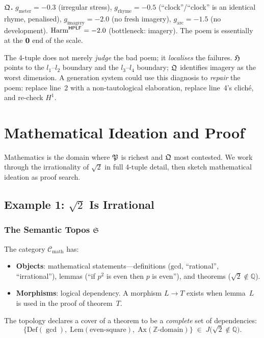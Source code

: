\textbf{$\mathfrak{Q}$.}\quad
$g_{\mathrm{meter}}=-0.3$ (irregular stress),
$g_{\mathrm{rhyme}}=-0.5$ (``clock''/``clock'' is an identical
rhyme, penalised),
$g_{\mathrm{imagery}}=-2.0$ (no fresh imagery),
$g_{\mathrm{arc}}=-1.5$ (no development).
$\mathrm{Harm}^{\mathsf{HPLF}}=-2.0$ (bottleneck: imagery).
The poem is essentially at the $\mathbf{0}$ end of the scale.

\begin{remark}
The 4-tuple does not merely \emph{judge} the bad poem; it
\emph{localises} the failures.  $\mathfrak{H}$ points to the
$l_1$--$l_2$ boundary and the $l_3$--$l_4$ boundary;
$\mathfrak{Q}$ identifies imagery as the worst dimension.  A
generation system could use this diagnosis to \emph{repair}
the poem: replace line~2 with a non-tautological elaboration,
replace line~4's clich\'e, and re-check $H^1$.
\end{remark}

\chapter{Mathematical Ideation and Proof}
\label{ch:ex-math}

Mathematics is the domain where $\mathfrak{P}$ is richest and $\mathfrak{Q}$
most contested.  We work through the irrationality of $\sqrt{2}$
in full 4-tuple detail, then sketch mathematical ideation as
proof search.

\section{Example 1: $\sqrt{2}$ Is Irrational}
\label{sec:sqrt2}

\subsection{The Semantic Topos $\mathfrak{S}$}

\begin{construction}
\label{con:math-site}
The category $\mathcal{C}_{\mathrm{math}}$ has:
\begin{itemize}[nosep]
  \item \textbf{Objects}: mathematical statements---definitions
    ($\mathrm{gcd}$, ``rational'', ``irrational''), lemmas
    (``if $p^2$ is even then $p$ is even''), and theorems
    ($\sqrt{2}\notin\mathbb{Q}$).
  \item \textbf{Morphisms}: logical dependency.  A morphism
    $L\to T$ exists when lemma~$L$ is used in the proof of
    theorem~$T$.
\end{itemize}
The topology declares a cover of a theorem to be a
\emph{complete} set of dependencies:
\[
  \bigl\{\text{Def}(\gcd),\;
         \text{Lem}(\text{even-square}),\;
         \text{Ax}(\mathbb{Z}\text{-domain})
  \bigr\}
  \;\in\;J\bigl(\sqrt{2}\notin\mathbb{Q}\bigr).
\]
\end{construction}

